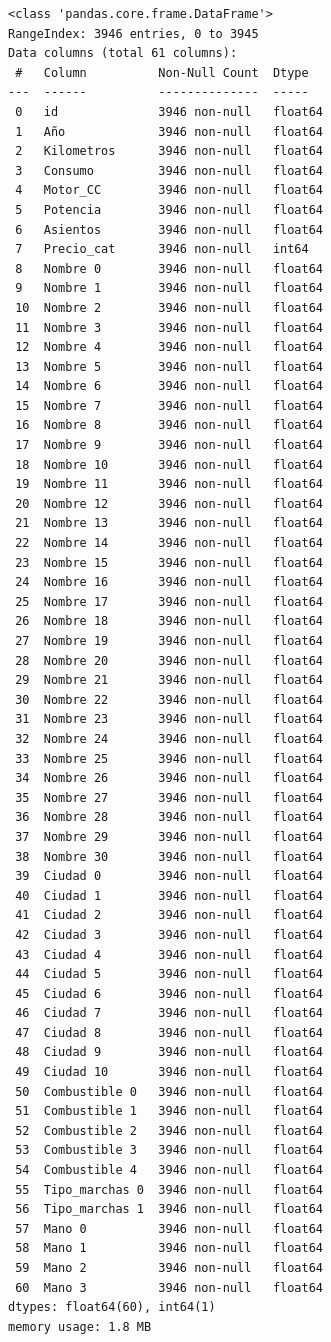 \documentclass[a4]{article}
\begin{document}
\begin{verbatim}
<class 'pandas.core.frame.DataFrame'>
RangeIndex: 3946 entries, 0 to 3945
Data columns (total 61 columns):
 #   Column          Non-Null Count  Dtype  
---  ------          --------------  -----  
 0   id              3946 non-null   float64
 1   Año             3946 non-null   float64
 2   Kilometros      3946 non-null   float64
 3   Consumo         3946 non-null   float64
 4   Motor_CC        3946 non-null   float64
 5   Potencia        3946 non-null   float64
 6   Asientos        3946 non-null   float64
 7   Precio_cat      3946 non-null   int64  
 8   Nombre 0        3946 non-null   float64
 9   Nombre 1        3946 non-null   float64
 10  Nombre 2        3946 non-null   float64
 11  Nombre 3        3946 non-null   float64
 12  Nombre 4        3946 non-null   float64
 13  Nombre 5        3946 non-null   float64
 14  Nombre 6        3946 non-null   float64
 15  Nombre 7        3946 non-null   float64
 16  Nombre 8        3946 non-null   float64
 17  Nombre 9        3946 non-null   float64
 18  Nombre 10       3946 non-null   float64
 19  Nombre 11       3946 non-null   float64
 20  Nombre 12       3946 non-null   float64
 21  Nombre 13       3946 non-null   float64
 22  Nombre 14       3946 non-null   float64
 23  Nombre 15       3946 non-null   float64
 24  Nombre 16       3946 non-null   float64
 25  Nombre 17       3946 non-null   float64
 26  Nombre 18       3946 non-null   float64
 27  Nombre 19       3946 non-null   float64
 28  Nombre 20       3946 non-null   float64
 29  Nombre 21       3946 non-null   float64
 30  Nombre 22       3946 non-null   float64
 31  Nombre 23       3946 non-null   float64
 32  Nombre 24       3946 non-null   float64
 33  Nombre 25       3946 non-null   float64
 34  Nombre 26       3946 non-null   float64
 35  Nombre 27       3946 non-null   float64
 36  Nombre 28       3946 non-null   float64
 37  Nombre 29       3946 non-null   float64
 38  Nombre 30       3946 non-null   float64
 39  Ciudad 0        3946 non-null   float64
 40  Ciudad 1        3946 non-null   float64
 41  Ciudad 2        3946 non-null   float64
 42  Ciudad 3        3946 non-null   float64
 43  Ciudad 4        3946 non-null   float64
 44  Ciudad 5        3946 non-null   float64
 45  Ciudad 6        3946 non-null   float64
 46  Ciudad 7        3946 non-null   float64
 47  Ciudad 8        3946 non-null   float64
 48  Ciudad 9        3946 non-null   float64
 49  Ciudad 10       3946 non-null   float64
 50  Combustible 0   3946 non-null   float64
 51  Combustible 1   3946 non-null   float64
 52  Combustible 2   3946 non-null   float64
 53  Combustible 3   3946 non-null   float64
 54  Combustible 4   3946 non-null   float64
 55  Tipo_marchas 0  3946 non-null   float64
 56  Tipo_marchas 1  3946 non-null   float64
 57  Mano 0          3946 non-null   float64
 58  Mano 1          3946 non-null   float64
 59  Mano 2          3946 non-null   float64
 60  Mano 3          3946 non-null   float64
dtypes: float64(60), int64(1)
memory usage: 1.8 MB
\end{verbatim}
\end{document}
